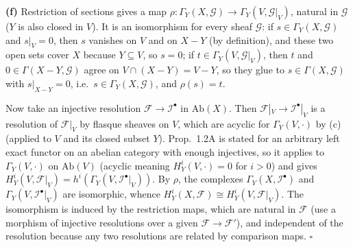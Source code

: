 \documentclass[11pt]{article}
\begin{document}
\textbf{(f)} Restriction of sections gives a map $\rho:\Gamma_Y(X,\mathcal G)\to\Gamma_Y(V,\mathcal G|_V)$, natural in $\mathcal G$ ($Y$ is also closed in $V$). It is an isomorphism for every sheaf $\mathcal G$: if $s\in\Gamma_Y(X,\mathcal G)$ and $s|_V=0$, then $s$ vanishes on $V$ and on $X-Y$ (by definition), and these two open sets cover $X$ because $Y\subseteq V$, so $s=0$; if $t\in\Gamma_Y(V,\mathcal G|_V)$, then $t$ and $0\in\Gamma(X-Y,\mathcal G)$ agree on $V\cap(X-Y)=V-Y$, so they glue to $s\in\Gamma(X,\mathcal G)$ with $s|_{X-Y}=0$, i.e.\ $s\in\Gamma_Y(X,\mathcal G)$, and $\rho(s)=t$.

Now take an injective resolution $\mathcal F\to\mathcal I^\bullet$ in $\mathrm{Ab}(X)$. Then $\mathcal F|_V\to\mathcal I^\bullet|_V$ is a resolution of $\mathcal F|_V$ by flasque sheaves on $V$, which are acyclic for $\Gamma_Y(V,\cdot)$ by (c) (applied to $V$ and its closed subset $Y$). Prop.~1.2A is stated for an arbitrary left exact functor on an abelian category with enough injectives, so it applies to $\Gamma_Y(V,\cdot)$ on $\mathrm{Ab}(V)$ (acyclic meaning $H^i_Y(V,\cdot)=0$ for $i>0$) and gives $H^i_Y(V,\mathcal F|_V)=h^i(\Gamma_Y(V,\mathcal I^\bullet|_V))$. By $\rho$, the complexes $\Gamma_Y(X,\mathcal I^\bullet)$ and $\Gamma_Y(V,\mathcal I^\bullet|_V)$ are isomorphic, whence $H^i_Y(X,\mathcal F)\cong H^i_Y(V,\mathcal F|_V)$. The isomorphism is induced by the restriction maps, which are natural in $\mathcal F$ (use a morphism of injective resolutions over a given $\mathcal F\to\mathcal F'$), and independent of the resolution because any two resolutions are related by comparison maps. \hfill$\square$
\end{document}
